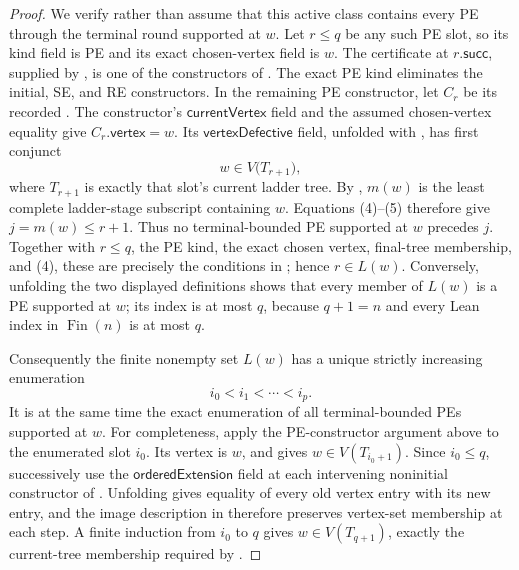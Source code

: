 \begin{proof}
We verify rather than assume that this active class contains every PE
through the terminal round supported at \(w\).  Let \(r\leq q\) be any
such PE slot, so its kind field is PE and its exact chosen-vertex field is
\(w\).  The certificate at \(r.\mathsf{succ}\), supplied by
, is one of the constructors of
.  The exact PE kind eliminates the initial,
SE, and RE constructors.  In the remaining PE constructor, let \(C_r\)
be its recorded .  The constructor's
\(\mathsf{currentVertex}\) field and the assumed chosen-vertex equality
give
\(C_r.\mathsf{vertex}=w\).  Its
\(\mathsf{vertexDefective}\) field, unfolded with
, has first conjunct
\[
 w\in V\bigl(T_{r+1}\bigr),                                  \tag{5}
\]
where \(T_{r+1}\) is exactly that slot's current ladder tree.
By , \(m(w)\) is the least complete
ladder-stage subscript containing \(w\).  Equations (4)--(5) therefore
give \(j=m(w)\leq r+1\).  Thus no terminal-bounded PE supported at
\(w\) precedes \(j\).  Together with \(r\leq q\), the PE kind, the exact
chosen vertex, final-tree membership, and (4), these are precisely the
conditions in ; hence
\(r\in L(w)\).  Conversely, unfolding the two displayed definitions
shows that every member of \(L(w)\) is a PE supported at \(w\); its index
is at most \(q\), because \(q+1=n\) and every Lean index in
\(\operatorname{Fin}(n)\) is at most \(q\).

Consequently the finite nonempty set \(L(w)\) has a unique strictly
increasing enumeration
\[
                         i_0<i_1<\cdots<i_p.                    \tag{6}
\]
It is at the same time the exact enumeration of all terminal-bounded PEs
supported at \(w\).  For completeness, apply the PE-constructor argument
above to the enumerated slot \(i_0\).  Its
 vertex is \(w\), and
 gives \(w\in V(T_{i_0+1})\).  Since
\(i_0\leq q\), successively use the
\(\mathsf{orderedExtension}\) field at each intervening noninitial
constructor of .  Unfolding
 gives equality of every old vertex
entry with its new entry, and the image description in
 therefore preserves vertex-set
membership at each step.  A finite induction from \(i_0\) to \(q\)
gives \(w\in V(T_{q+1})\), exactly the current-tree membership required
by .


\end{proof}
